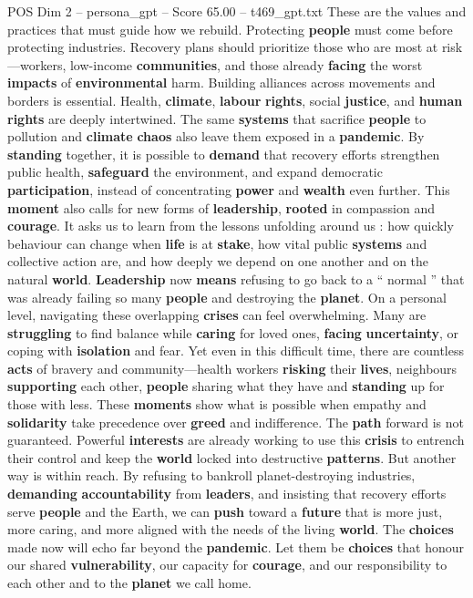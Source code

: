 \begin{textsample}{POS Dim 2 – persona\_gpt – Score 65.00 – t469\_gpt.txt}
These are the values and practices that must guide how we rebuild.
Protecting \textbf{people} must come before protecting industries.
Recovery plans should prioritize those who are most at risk—workers, low-income \textbf{communities}, and those already \textbf{facing} the worst \textbf{impacts} of \textbf{environmental} harm.
Building alliances across movements and borders is essential.
Health, \textbf{climate}, \textbf{labour} \textbf{rights}, social \textbf{justice}, and \textbf{human} \textbf{rights} are deeply intertwined.
The same \textbf{systems} that sacrifice \textbf{people} to pollution and \textbf{climate} \textbf{chaos} also leave them exposed in a \textbf{pandemic}.
By \textbf{standing} together, it is possible to \textbf{demand} that recovery efforts strengthen public health, \textbf{safeguard} the environment, and expand democratic \textbf{participation}, instead of concentrating \textbf{power} and \textbf{wealth} even further.
This \textbf{moment} also calls for new forms of \textbf{leadership}, \textbf{rooted} in compassion and \textbf{courage}.
It asks us to learn from the lessons unfolding around us : how quickly behaviour can change when \textbf{life} is at \textbf{stake}, how vital public \textbf{systems} and collective action are, and how deeply we depend on one another and on the natural \textbf{world}. \textbf{Leadership} now \textbf{means} refusing to go back to a “ normal ” that was already failing so many \textbf{people} and destroying the \textbf{planet}.
On a personal level, navigating these overlapping \textbf{crises} can feel overwhelming.
Many are \textbf{struggling} to find balance while \textbf{caring} for loved ones, \textbf{facing} \textbf{uncertainty}, or coping with \textbf{isolation} and fear.
Yet even in this difficult time, there are countless \textbf{acts} of bravery and community—health workers \textbf{risking} their \textbf{lives}, neighbours \textbf{supporting} each other, \textbf{people} sharing what they have and \textbf{standing} up for those with less.
These \textbf{moments} show what is possible when empathy and \textbf{solidarity} take precedence over \textbf{greed} and indifference.
The \textbf{path} forward is not guaranteed.
Powerful \textbf{interests} are already working to use this \textbf{crisis} to entrench their control and keep the \textbf{world} locked into destructive \textbf{patterns}.
But another way is within reach.
By refusing to bankroll planet-destroying industries, \textbf{demanding} \textbf{accountability} from \textbf{leaders}, and insisting that recovery efforts serve \textbf{people} and the Earth, we can \textbf{push} toward a \textbf{future} that is more just, more caring, and more aligned with the needs of the living \textbf{world}.
The \textbf{choices} made now will echo far beyond the \textbf{pandemic}.
Let them be \textbf{choices} that honour our shared \textbf{vulnerability}, our capacity for \textbf{courage}, and our responsibility to each other and to the \textbf{planet} we call home.


\end{textsample}
